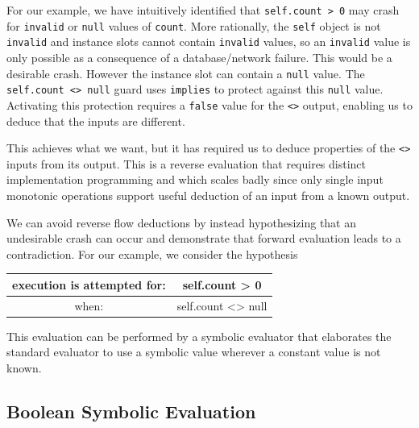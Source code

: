 \documentclass[
]{ceurart}
\begin{document}
For our example, we have intuitively identified that \verb|self.count > 0| may crash for \verb|invalid| or \verb|null| values of \verb|count|. More rationally, the \verb|self| object is not \verb|invalid| and instance slots cannot contain \verb|invalid| values, so an \verb|invalid| value is only possible as a consequence of a database/network failure. This would be a desirable crash. However the instance slot can contain a \verb|null| value. The \verb|self.count <> null| guard uses \verb|implies| to protect against this \verb|null| value. Activating this protection requires a \verb|false| value for the \verb|<>| output, enabling us to deduce that the inputs are different.

This achieves what we want, but it has required us to deduce properties of the \verb|<>| inputs from its output. This is a reverse evaluation that requires distinct implementation programming and which scales badly since only single input monotonic operations support useful deduction of an input from a known output.

We can avoid reverse flow deductions by instead hypothesizing that an undesirable crash can occur and demonstrate that forward evaluation leads to a contradiction. For our example, we consider the hypothesis

\begin{center}
	\begin{tabular}{c|c}
		execution is attempted for: & self.count > 0 \\
		\hline
		when: & self.count <> null \\
	\end{tabular}
\end{center}

This evaluation can be performed by a symbolic evaluator that elaborates the standard evaluator to use a symbolic value wherever a constant value is not known.

\subsection{Boolean Symbolic Evaluation}
\end{document}

